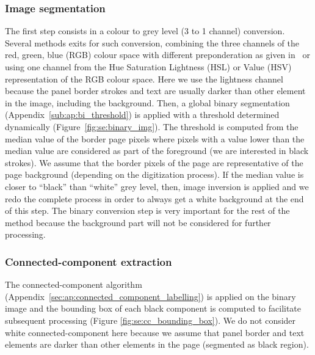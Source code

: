 \subsubsection{Image segmentation} %
\label{par:se:image_segmentation}

The first step consists in a colour to grey level (3 to 1 channel) conversion.
Several methods exits for such conversion, combining the three channels of the red, green, blue (RGB) colour space with different preponderation as given in~\cite{Pratt91} or using one channel from the Hue Saturation Lightness (HSL) or Value (HSV) representation of the RGB colour space.
Here we use the lightness channel because the panel border strokes and text are usually darker than other element in the image, including the background. 
Then, a global binary segmentation (Appendix~\ref{sub:ap:bi_threshold}) is applied with a threshold determined dynamically (Figure~\ref{fig:se:binary_img}).
The threshold is computed from the median value of the border page pixels where pixels with a value lower than the median value are considered as part of the foreground (we are interested in black strokes).
We assume that the border pixels of the page are representative of the page background (depending on the digitization process).
If the median value is closer to ``black'' than ``white'' grey level, then, image inversion is applied and we redo the complete process in order to always get a white background at the end of this step.
The binary conversion step is very important for the rest of the method because the background part will not be considered for further processing. %


\subsubsection{Connected-component extraction} %
 \label{par:connected_component_extraction}
 
The connected-component algorithm (Appendix~\ref{sec:ap:connected_component_labelling}) is applied on the binary image and the bounding box of each black component is computed to facilitate subsequent processing (Figure \ref{fig:se:cc_bounding_box}).
We do not consider white connected-component here because we assume that panel border and text elements are darker than other elements in the page (segmented as black region).

